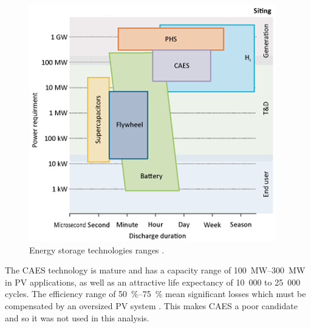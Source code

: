 \begin{figure}[htbp]  
\centering
\includegraphics[width=0.6\linewidth]{FIG/EEStechnologies}
\caption[Energy storage technologies ranges.]{Energy storage technologies ranges \cite{IEA2014c}.}\label{EEStechnologies}
\end{figure}

The CAES technology is mature and has a capacity range of \SIrange{100}{300}{\mega\watt} in PV applications, as well as an attractive life expectancy of 10~000 to 25~000 cycles. The efficiency range of \SIrange{50}{75}{\percent} mean significant losses which must be compensated by an oversized PV system \cite{IEA2014c}. This makes CAES a poor candidate and so it was not used in this analysis.


